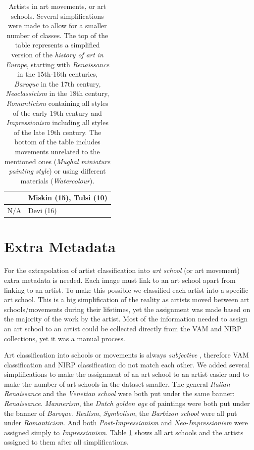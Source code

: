 \documentclass[11pt,a4paper,twoside,openright]{report}
\begin{document}
\begin{table}[htp]
\begin{tabular}{|l|l|}
                     &  Miskin (15), Tulsi (10)                         \\
\midrule
N/A                  &  Devi (16) \\
\bottomrule
\end{tabular}
\caption[Artists in art movements]{Artists in art movements, or art schools.
Several simplifications were made to allow for a smaller number of classes.
The top of the table represents a simplified version of the \emph{history of
art in Europe}, starting with \emph{Renaissance} in the 15th-16th centuries,
\emph{Baroque} in the 17th century, \emph{Neoclassicism} in the 18th century,
\emph{Romanticism} containing all styles of the early 19th century and
\emph{Impressionism} including all styles of the late 19th century.  The bottom
of the table includes movements unrelated to the mentioned ones (\emph{Mughal
miniature painting style}) or using different materials (\emph{Watercolour}).}
\label{tab:style}
\end{table}

\section{Extra Metadata}

For the extrapolation of artist classification into \emph{art school} (or art
movement) extra metadata is needed.  Each image must link to an art school
apart from linking to an artist.  To make this possible we classified each
artist into a specific art school.  This is a big simplification of the reality
as artists moved between art schools/movements during their lifetimes, yet the
assignment was made based on the majority of the work by the artist.  Most of
the information needed to assign an art school to an artist could be collected
directly from the VAM and NIRP collections, yet it was a manual process.

Art classification into schools or movements is always \emph{subjective}
\cite{dimaggio87art}, therefore VAM classification and NIRP classification do
not match each other.  We added several simplifications to make the assignment
of an art school to an artist easier and to make the number of art schools in
the dataset smaller.  The general \emph{Italian Renaissance} and the
\emph{Venetian school} were both put under the same banner: \emph{Renaissance}.
\emph{Mannerism}, the \emph{Dutch golden age} of paintings were both put under
the banner of \emph{Baroque}.  \emph{Realism}, \emph{Symbolism}, the
\emph{Barbizon school} were all put under \emph{Romanticism}.  And both
\emph{Post-Impressionism} and \emph{Neo-Impressionism} were assigned simply to
\emph{Impressionism}.  Table \ref{tab:style} shows all art schools and the
artists assigned to them after all simplifications.
\end{document}
